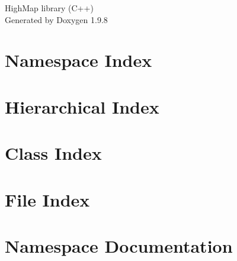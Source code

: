 \documentclass[twoside]{book}
\newcommand{\+}{\discretionary{\mbox{\scriptsize$\hookleftarrow$}}{}{}}
\newcommand{\clearemptydoublepage}{%
    \newpage{\pagestyle{empty}\cleardoublepage}%
  }
\begin{document}
  \raggedbottom
    \hypersetup{pageanchor=false,
                bookmarksnumbered=true,
                pdfencoding=unicode
               }
  \begin{titlepage}
  \vspace*{7cm}
  \begin{center}%
  {\Large High\+Map library (\+C++)}\\
  \vspace*{1cm}
  {\large Generated by Doxygen 1.9.8}\\
  \end{center}
  \end{titlepage}
  \clearemptydoublepage
  \tableofcontents
  \clearemptydoublepage
  \hypersetup{pageanchor=true}


\chapter{Namespace Index}

\chapter{Hierarchical Index}

\chapter{Class Index}

\chapter{File Index}

\chapter{Namespace Documentation}



\end{document}
